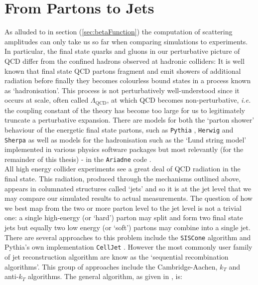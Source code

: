 \section{From Partons to Jets}

	As alluded to in section (\ref{sec:betaFunction}) the computation of scattering amplitudes can only take us so far
	when comparing simulations to experiments.  In particular, the final state quarks and gluons in our perturbative
	picture of QCD differ from the confined hadrons observed at hadronic colliders:  It is well known that final state
	QCD partons fragment and emit showers of additional radiation before finally they becomes colourless bound states
	in a process known as `hadronisation'.  This process is not perturbatively well-understood since it occurs at scale,
	often called $\Lambda_{\text{QCD}}$, at which QCD becomes non-perturbative, \emph{i.e.} the coupling constant of the
	theory has become too large for us to legitimately truncate a perturbative expansion.  There are models for both
	the `parton shower' behaviour of the energetic final state partons, such as \texttt{Pythia} \cite{Sjostrand:2007gs},
	\texttt{Herwig} \cite{Corcella:2000bw} and \texttt{Sherpa} \cite{Hoche:2014kca} as well as models for the hadronisation
	such as the `Lund string model' \cite{Andersson:2002ap} implemented in various physics software packages but most
	relevantly (for the remainder of this thesis) - in the \texttt{Ariadne} code \cite{Lonnblad:1992tz,Andersen:2011zd}.\\
	All high energy collider experiments
	see a great deal of QCD radiation in the final state.  This radiation, produced through the mechanisms outlined above,
	appears in columnated structures called `jets' and so it is at the jet level that we may compare our simulated results
	to actual measurements. The question of how we best map from the two or more parton level to the jet level is not a trivial
	one:  a single high-energy (or `hard') parton may split and form two final state jets but equally two low energy (or
	`soft') partons may combine into a single jet.\\There are several approaches to this problem include the \texttt{SISCone}
	algorithm \cite{Salam:2007xv} and Pythia's own implementation \texttt{CellJet} \cite{Sjostrand:2000wi}. However the
	most commonly user family of jet reconstruction algorithm are know as the `sequential recombination algorithms'.
	This group of approaches include the Cambridge-Aachen, $k_T$ and anti-$k_T$ algorithms. The general algorithm, as
	given in \cite{Cacciari:2008gp}, is:

